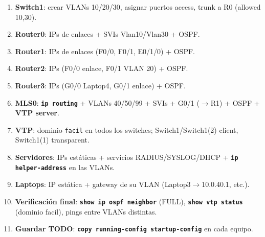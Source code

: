\documentclass[11pt,a4paper]{report}
\newcommand{\cmd}[1]{\texttt{\textbf{#1}}}
\begin{document}
\begin{enumerate}
  \item \textbf{Switch1}: crear VLANs 10/20/30, asignar puertos access, trunk a R0 (allowed 10,30).
  \item \textbf{Router0}: IPs de enlaces + SVIs Vlan10/Vlan30 + OSPF.
  \item \textbf{Router1}: IPs de enlaces (F0/0, F0/1, E0/1/0) + OSPF.
  \item \textbf{Router2}: IPs (F0/0 enlace, F0/1 VLAN 20) + OSPF.
  \item \textbf{Router3}: IPs (G0/0 Laptop4, G0/1 enlace) + OSPF.
  \item \textbf{MLS0}: \cmd{ip routing} + VLANs 40/50/99 + SVIs + G0/1 ($\rightarrow$R1) + OSPF + \textbf{VTP server}.
  \item \textbf{VTP}: dominio \texttt{facil} en todos los switches; Switch1/Switch1(2) client, Switch1(1) transparent.
  \item \textbf{Servidores}: IPs estáticas + servicios RADIUS/SYSLOG/DHCP + \cmd{ip helper-address} en las VLANs.
  \item \textbf{Laptops}: IP estática + gateway de su VLAN (Laptop3$\rightarrow$10.0.40.1, etc.).
  \item \textbf{Verificación final}: \cmd{show ip ospf neighbor} (FULL), \cmd{show vtp status} (dominio facil), pings entre VLANs distintas.
  \item \textbf{Guardar TODO}: \cmd{copy running-config startup-config} en cada equipo.
\end{enumerate}
\end{document}

